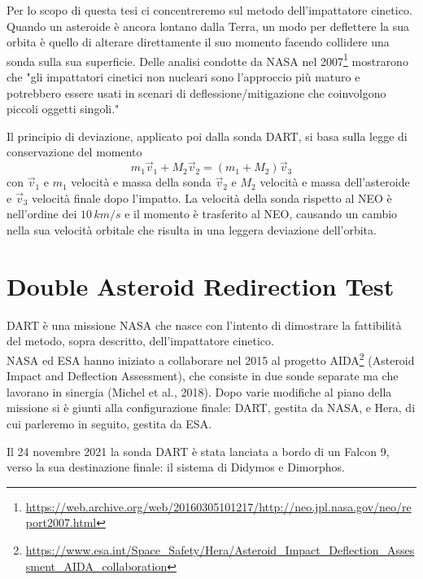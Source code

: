 \documentclass[a4paper,11pt,openright]{book}
\begin{document}
Per lo scopo di questa tesi ci concentreremo sul metodo dell'impattatore cinetico.\\
Quando un asteroide è ancora lontano dalla Terra, un modo per deflettere la sua orbita è quello di alterare direttamente il suo momento facendo collidere una sonda sulla sua superficie. Delle analisi condotte da NASA nel 2007\footnote{\href{https://web.archive.org/web/20160305101217/http://neo.jpl.nasa.gov/neo/report2007.html}{https://web.archive.org/web/20160305101217/http://neo.jpl.nasa.gov/neo/report2007.html}} mostrarono che "gli impattatori cinetici non nucleari sono l'approccio più maturo e potrebbero essere usati in scenari di deflessione/mitigazione che coinvolgono piccoli oggetti singoli."

Il principio di deviazione, applicato poi dalla sonda DART, si basa sulla legge di conservazione del momento
\begin{equation}
    m_1 \vec{v}_1 + M_2\vec{v}_2 = (m_1+M_2)\vec{v}_3
\end{equation}
con $\vec{v}_1$ e $m_1$ velocità e massa della sonda $\vec{v}_2$ e $M_2$ velocità e massa dell'asteroide e $\vec{v}_3$ velocità finale dopo l'impatto. 
La velocità della sonda rispetto al NEO è nell'ordine dei $10\,km/s$ e il momento è trasferito al NEO, causando un cambio nella sua velocità orbitale che risulta in una leggera deviazione dell'orbita.

\section{Double Asteroid Redirection Test}\label{sec:DART}
DART è una missione NASA che nasce con l'intento di dimostrare la fattibilità del metodo, sopra descritto, dell'impattatore cinetico.\\
NASA ed ESA hanno iniziato a collaborare nel 2015 al progetto AIDA\footnote{\href{https://www.esa.int/Space_Safety/Hera/Asteroid_Impact_Deflection_Assessment_AIDA_collaboration}{https://www.esa.int/Space\_Safety/Hera/Asteroid\_Impact\_Deflection\_Assessment\_AIDA\_collaboration}} (Asteroid Impact and Deflection Assessment), che consiste in due sonde separate ma che lavorano in sinergia (Michel et al., 2018). Dopo varie modifiche al piano della missione si è giunti alla configurazione finale: DART, gestita da NASA, e Hera, di cui parleremo in seguito, gestita da ESA.

Il 24 novembre 2021 la sonda DART è stata lanciata a bordo di un Falcon 9, verso la sua destinazione finale: il sistema di Didymos e Dimorphos.
\end{document}
